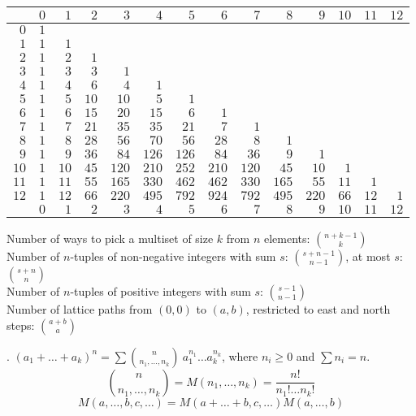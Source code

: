 \begin{tabular}{r|rrrrrrrrrrrrr}
    & $0$ & $1$ & $2$ & $3$ & $4$ & $5$ & $6$ & $7$ & $8$ & $9$ & $10$ & $11$ & $12$ \\
    \hline
    $0$ & $1$\\
    $1$ & $1$ & $1$\\
    $2$ & $1$ & $2$ & $1$\\
    $3$ & $1$ & $3$ & $3$ & $1$\\
    $4$ & $1$ & $4$ & $6$ & $4$ & $1$\\
    $5$ & $1$ & $5$ & $10$ & $10$ & $5$ & $1$\\
    $6$ & $1$ & $6$ & $15$ & $20$ & $15$ & $6$ & $1$\\
    $7$ & $1$ & $7$ & $21$ & $35$ & $35$ & $21$ & $7$ & $1$\\
    $8$ & $1$ & $8$ & $28$ & $56$ & $70$ & $56$ & $28$ & $8$ & $1$\\
    $9$ & $1$ & $9$ & $36$ & $84$ & $126$ & $126$ & $84$ & $36$ & $9$ & $1$\\
    $10$ & $1$ & $10$ & $45$ & $120$ & $210$ & $252$ & $210$ & $120$ & $45$ & $10$ & $1$\\
    $11$ & $1$ & $11$ & $55$ & $165$ & $330$ & $462$ & $462$ & $330$ & $165$ & $55$ & $11$ & $1$\\
    $12$ & $1$ & $12$ & $66$ & $220$ & $495$ & $792$ & $924$ & $792$ & $495$ & $220$ & $66$ & $12$ & $1$ \\
    \hline
    & $0$ & $1$ & $2$ & $3$ & $4$ & $5$ & $6$ & $7$ & $8$ & $9$ & $10$ & $11$ & $12$
\end{tabular}

Number of ways to pick a multiset of size $k$ from $n$ elements: ${n+k-1 \choose k}$ \\
Number of $n$-tuples of non-negative integers with sum $s$:
${{s+n-1} \choose {n-1}}$, at most $s$: ${{s + n} \choose {n}}$ \\
Number of $n$-tuples of positive integers with sum $s$:
${{s-1} \choose {n-1}}$ \\
Number of lattice paths from $(0,0)$ to $(a,b)$, restricted to east and north
steps: ${a+b \choose a}$

.
$(a_1+\dots+a_k)^n = \sum {n \choose n_1,\dots,n_k}\
a_1^{n_1} \dots a_k^{n_k}$,
where $n_i \ge 0$ and $\sum n_i=n$. \\
$${n \choose n_1,\dots,n_k} = M(n_1,\dots,n_k) = \frac{n!}{n_1! \dots n_k!}$$
$$M(a,\dots,b,c,\dots) = M(a+\dots+b,c,\dots) M(a,\dots,b)$$

